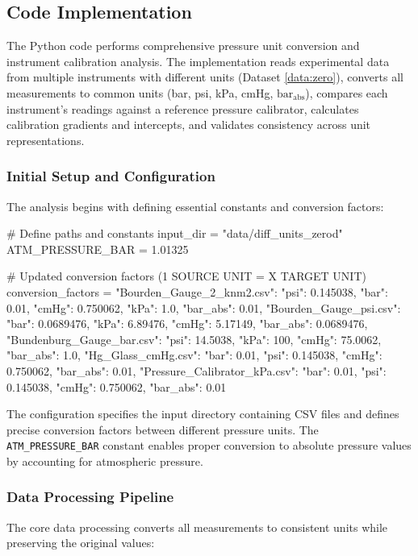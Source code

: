 \documentclass{article}
\begin{document}
\subsection{Code Implementation}\label{subsec:code}

The Python code performs comprehensive pressure unit conversion and instrument calibration analysis. The implementation reads experimental data from multiple instruments with different units (Dataset \ref{data:zero}), converts all measurements to common units (bar, psi, kPa, cmHg, $\text{bar}_{\text{abs}}$), compares each instrument's readings against a reference pressure calibrator, calculates calibration gradients and intercepts, and validates consistency across unit representations.\vspace{-1em}
\subsubsection{Initial Setup and Configuration}
The analysis begins with defining essential constants and conversion factors:
\begin{python}
# Define paths and constants
input_dir = "data/diff_units_zerod"
ATM_PRESSURE_BAR = 1.01325

# Updated conversion factors (1 SOURCE UNIT = X TARGET UNIT)
conversion_factors = {
    "Bourden_Gauge_2_knm2.csv": {"psi": 0.145038, "bar": 0.01, "cmHg": 0.750062, "kPa": 1.0, "bar_abs": 0.01},
    "Bourden_Gauge_psi.csv": {"bar": 0.0689476, "kPa": 6.89476, "cmHg": 5.17149, "bar_abs": 0.0689476},
    "Bundenburg_Gauge_bar.csv": {"psi": 14.5038, "kPa": 100, "cmHg": 75.0062, "bar_abs": 1.0},
    "Hg_Glass_cmHg.csv": {"bar": 0.01, "psi": 0.145038, "cmHg": 0.750062, "bar_abs": 0.01},
    "Pressure_Calibrator_kPa.csv": {"bar": 0.01, "psi": 0.145038, "cmHg": 0.750062, "bar_abs": 0.01}
}
\end{python}
The configuration specifies the input directory containing CSV files and defines precise conversion factors between different pressure units. The \texttt{ATM\_PRESSURE\_BAR} constant enables proper conversion to absolute pressure values by accounting for atmospheric pressure.\vspace{-1em}
\subsubsection{Data Processing Pipeline}
The core data processing converts all measurements to consistent units while preserving the original values:
\end{document}
